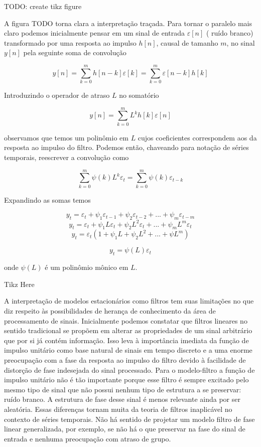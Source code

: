 TODO: create tikz figure

A figura TODO torna clara a interpretação traçada. Para tornar o paralelo mais
claro podemos inicialmente pensar em um sinal de entrada $\varepsilon[n]$ (
ruído branco) transformado por uma resposta ao impulso $h[n]$, causal de
tamanho $m$, no sinal $y[n]$ pela seguinte soma de convolução

$$ y[n] = \sum^{m}_{k=0} h[n-k]\varepsilon[k] =  \sum^{m}_{k=0} \varepsilon[n-k]h[k]$$

Introduzindo o operador de atraso $L$ no somatório

$$ y[n] = \sum^{m}_{k=0} L^{k}h[k] \varepsilon[n]$$

observamos que temos um polinômio em $L$ cujos coeficientes correspondem aos
da resposta ao impulso do filtro. Podemos então, chaveando para notação de
séries temporais, reescrever a convolução como

$$ \sum^{m}_{k=0} \psi(k)L^k\varepsilon_{t} = \sum^{m}_{k=0} \psi(k)\varepsilon_{t-k}$$

Expandindo as somas temos

$$ y_t = \varepsilon_t + \psi_1 \varepsilon_{t-1} + \psi_2 \varepsilon_{t-2} + ... +  \psi_m \varepsilon_{t-m}$$
$$ y_t = \varepsilon_t + \psi_1 L\varepsilon_{t} + \psi_2 L^2 \varepsilon_{t} + ... +  \psi_m L^m \varepsilon_{t}$$
$$ y_t = \varepsilon_t(1 + \psi_1 L + \psi_2 L^2 + ... + \psi L^m)$$

\begin{equation}\label{eq:fir}
    y_t = \psi(L)\varepsilon_t
\end{equation}

onde $\psi(L)$ é um polinômio mônico em $L$.

Tikz Here


A interpretação de modelos estacionários como filtros tem suas limitações no
que diz respeito às possibilidades de herança de conhecimento da área de
processamento de sinais. Inicialmente podemos constatar que filtros lineares no
sentido tradicional se propõem em alterar as propriedades de um sinal
arbitrário que por si já contém informação. Isso leva à importância imediata da
função de impulso unitário como base natural de sinais em tempo discreto e a
uma enorme preocupação com a fase da resposta ao impulso do filtro devido à
facilidade de distorção de fase indesejada do sinal processado. Para o
modelo-filtro a função de impulso unitário não é tão importante porque esse
filtro é sempre excitado pelo mesmo tipo de sinal que não possui nenhum tipo de
estrutura a se preservar: ruído branco. A estrutura de fase desse sinal é menos
relevante ainda por ser aleatória. Essas diferenças tornam muita da teoria de
filtros inaplicável no contexto de séries temporais. Não há sentido de projetar
um modelo filtro de fase linear generalizada, por exemplo, se não há o que
preservar na fase do sinal de entrada e nenhuma preocupação com atraso de grupo.

